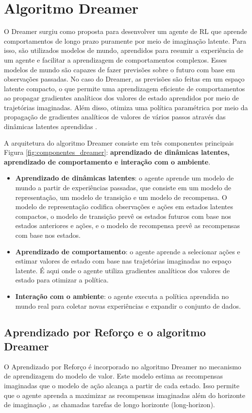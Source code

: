 \section{Algoritmo Dreamer}
\label{sec:dreamer}
O Dreamer surgiu como proposta para desenvolver um agente de RL que aprende comportamentos de longo prazo puramente por meio de imaginação latente. Para isso, são utilizados modelos de mundo, aprendidos para resumir a experiência de um agente e facilitar a aprendizagem de comportamentos complexos. Esses modelos de mundo são capazes de fazer previsões sobre o futuro com base em observações passadas. No caso do Dreamer, as previsões são feitas em um espaço latente compacto, o que permite uma aprendizagem eficiente de comportamentos ao propagar gradientes analíticos dos valores de estado aprendidos por meio de trajetórias imaginadas. Além disso, otimiza uma política paramétrica por meio da propagação de gradientes analíticos de valores de vários passos através das dinâmicas latentes aprendidas \cite{dream_v1}.

A arquitetura do algoritmo Dreamer consiste em três componentes principais Figura \ref{fig:componentes_dreamer}:  \textbf{aprendizado de dinâmicas latentes, aprendizado de comportamento e interação com o ambiente}.
\begin{itemize}
\item \textbf{Aprendizado de dinâmicas latentes}: o agente aprende um modelo de mundo a partir de experiências passadas, que consiste em um modelo de representação, um modelo de transição e um modelo de recompensa. O modelo de representação codifica observações e ações em estados latentes compactos, o modelo de transição prevê os estados futuros com base nos estados anteriores e ações, e o modelo de recompensa prevê as recompensas com base nos estados.
\item \textbf{Aprendizado de comportamento}:  o agente aprende a selecionar ações e estimar valores de estado com base nas trajetórias imaginadas no espaço latente. É aqui onde o agente utiliza gradientes analíticos dos valores de estado para otimizar a política.
\item \textbf{ Interação com o ambiente}: o agente executa a política aprendida no mundo real para coletar novas experiências e expandir o conjunto de dados.
\end{itemize}

\subsection*{Aprendizado por Reforço e o algoritmo Dreamer}
O Aprendizado por Reforço é incorporado no algoritmo Dreamer no mecanismo de aprendizagem do modelo de valor. Este modelo estima as recompensas imaginadas que o modelo de ação alcança a partir de cada estado. Isso permite que o agente aprenda a maximizar as recompensas imaginadas além do horizonte de imaginação \cite{dream_v1}, as chamadas tarefas de longo horizonte (long-horizon).

